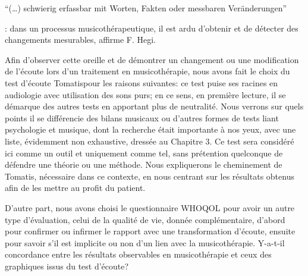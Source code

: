  \begin{german}
 ``(\ldots) schwierig erfassbar mit Worten, Fakten oder messbaren 
 Veränderungen''
 \end{german}  \autocite[175]{hegi_improvisation_1993}: dans un processus 
 	musicothérapeutique, il  
 est ardu d'obtenir et de détecter  des changements mesurables, 
  affirme F. Hegi.
 
 
 
 Afin d'observer cette oreille et de démontrer un changement ou une modification de l'écoute lors d'un 
 traitement en musicothérapie, %
  nous  avons fait le choix du test d'écoute Tomatis\textsuperscript \textregistered  pour 
 les raisons suivantes:  ce test 
 puise ses racines  en 
 audiologie avec utilisation des sons purs; en ce sens, en première lecture, il se démarque des autres 
 tests en apportant plus de neutralité. Nous verrons sur quels points il se différencie des bilans musicaux 
 ou 
 d'autres formes de tests liant psychologie et musique, dont la recherche était importante à nos yeux, 
 avec une liste, 
 évidemment non exhaustive, dressée au Chapitre 3. 
  Ce test sera considéré ici 
 comme un outil et uniquement comme tel, sans prétention quelconque de défendre une théorie ou une 
 méthode. Nous expliquerons le cheminement de Tomatis, nécessaire dans ce contexte, en  nous 
 centrant sur les 
 résultats obtenus afin de les mettre 
 au profit du patient.
 
 D'autre part, nous avons choisi le questionnaire WHOQOL pour avoir un autre type 
 d'évaluation, celui 
 de la qualité de vie, donnée complémentaire, d'abord  pour confirmer ou infirmer le rapport avec une  
 transformation d'écoute, ensuite pour savoir s'il est implicite  ou non d'un lien avec la musicothérapie.
 Y-a-t-il concordance entre  %
 les résultats observables en musicothérapie et ceux des  graphiques issus du test d'écoute?
 
